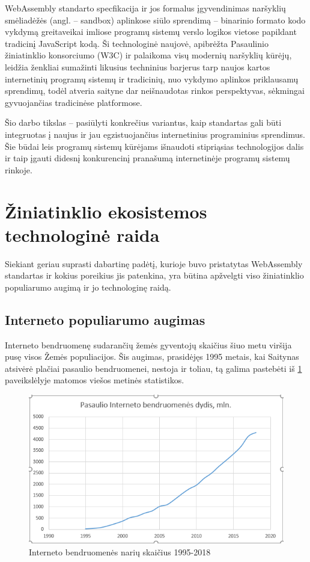 \documentclass{VUMIFPSkursinis}
\begin{document}
WebAssembly standarto specfikacija ir jos formalus įgyvendinimas naršyklių 
smėliadėžės (angl. – sandbox) aplinkose siūlo sprendimą – binarinio formato kodo vykdymą 
greitaveikai imliose programų sistemų verslo logikos vietose papildant tradicinį JavaScript 
kodą. Ši technologinė naujovė, apibrėžta Pasaulinio žiniatinklio konsorciumo (W3C) ir palaikoma
visų modernių naršyklių kūrėjų, leidžia ženkliai sumažinti likusius techninius barjerus tarp 
naujos kartos internetinių programų sistemų ir tradicinių, nuo vykdymo aplinkos priklausamų 
sprendimų, todėl atveria saityne dar neišnaudotas rinkos perspektyvas, sėkmingai gyvuojančias
tradicinėse platformose. 

Šio darbo tikslas – pasiūlyti konkrečius variantus, kaip standartas 
gali būti integruotas į naujus ir jau egzistuojančius internetinius programinius sprendimus. 
Šie būdai leis programų sistemų kūrėjams išnaudoti stipriąsias technologijos dalis ir taip 
įgauti didesnį konkurencinį pranašumą internetinėje programų sistemų rinkoje.

\section{Žiniatinklio ekosistemos technologinė raida}

Siekiant geriau suprasti dabartinę padėtį, kurioje buvo pristatytas WebAssembly standartas ir kokius poreikius jis patenkina, yra būtina apžvelgti viso žiniatinklio populiarumo augimą ir jo technologinę raidą.

\subsection{Interneto populiarumo augimas}

Interneto bendruomenę sudarančių žemės gyventojų skaičius šiuo metu viršija pusę visos Žemės populiacijos. Šis augimas, prasidėjęs 1995 metais, kai Saitynas atsivėrė plačiai pasaulio bendruomenei, nestoja ir toliau, tą galima pastebėti iš \ref{fig:internet_usage} paveikslėlyje matomos viešos metinės statistikos. 

\begin{figure}[h!]
  \includegraphics[scale=1]{interneto_naudojimo_statistika.png}
  \caption{Interneto bendruomenės narių skaičius 1995-2018}
  \label{fig:internet_usage}
\end{figure}
\end{document}

